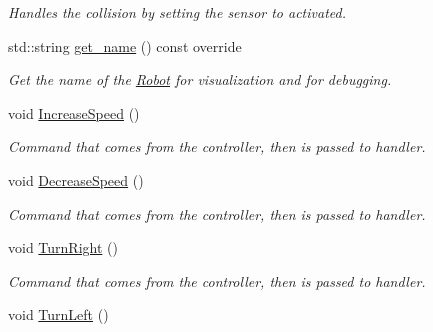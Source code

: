 \begin{DoxyCompactItemize}
\begin{DoxyCompactList}\small\item\em Handles the collision by setting the sensor to activated. \end{DoxyCompactList}\item 
std\+::string \hyperlink{classRobot_a3f77c13705b8f60480d21d8d936dc39e}{get\+\_\+name} () const override\hypertarget{classRobot_a3f77c13705b8f60480d21d8d936dc39e}{}\label{classRobot_a3f77c13705b8f60480d21d8d936dc39e}

\begin{DoxyCompactList}\small\item\em Get the name of the \hyperlink{classRobot}{Robot} for visualization and for debugging. \end{DoxyCompactList}\item 
void \hyperlink{classRobot_ae4647cccd002ca13659017e634237ead}{Increase\+Speed} ()\hypertarget{classRobot_ae4647cccd002ca13659017e634237ead}{}\label{classRobot_ae4647cccd002ca13659017e634237ead}

\begin{DoxyCompactList}\small\item\em Command that comes from the controller, then is passed to handler. \end{DoxyCompactList}\item 
void \hyperlink{classRobot_a94afa6f63eb22667261c07933faae481}{Decrease\+Speed} ()\hypertarget{classRobot_a94afa6f63eb22667261c07933faae481}{}\label{classRobot_a94afa6f63eb22667261c07933faae481}

\begin{DoxyCompactList}\small\item\em Command that comes from the controller, then is passed to handler. \end{DoxyCompactList}\item 
void \hyperlink{classRobot_a12b5883779f682c66e71bc54b6539694}{Turn\+Right} ()\hypertarget{classRobot_a12b5883779f682c66e71bc54b6539694}{}\label{classRobot_a12b5883779f682c66e71bc54b6539694}

\begin{DoxyCompactList}\small\item\em Command that comes from the controller, then is passed to handler. \end{DoxyCompactList}\item 
void \hyperlink{classRobot_ad864d21d997dbadf55f997c2f0143d41}{Turn\+Left} ()\hypertarget{classRobot_ad864d21d997dbadf55f997c2f0143d41}{}\label{classRobot_ad864d21d997dbadf55f997c2f0143d41}


\end{DoxyCompactItemize}
